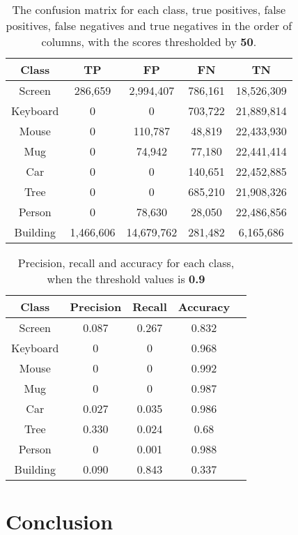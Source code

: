 \documentclass[conference]{IEEEtran}
\begin{document}
\begin{table}[!h]
\caption{The confusion matrix for each class, true positives, false positives, false negatives and true negatives in the order of columns, with the scores thresholded by \textbf{50}.}
\label{table_example}
\centering
\begin{tabular}{||c|c|c|c|c||}
\hline
Class & TP & FP & FN & TN \\
\hline
Screen & 286,659 & 2,994,407 & 786,161 & 18,526,309 \\
\hline
Keyboard & 0 & 0 & 703,722 & 21,889,814 \\
\hline
Mouse & 0 & 110,787 & 48,819 & 22,433,930 \\
\hline
Mug & 0 & 74,942 & 77,180 & 22,441,414 \\
\hline
Car & 0 & 0 & 140,651 & 22,452,885 \\
\hline
Tree & 0 & 0 & 685,210 & 21,908,326 \\
\hline
Person & 0 & 78,630 & 28,050 & 22,486,856 \\
\hline
Building & 1,466,606 & 14,679,762 & 281,482 & 6,165,686 \\
\hline
\end{tabular}
\end{table}

\begin{table}[!h]
\caption{Precision, recall and accuracy for each class, when the threshold values is \textbf{0.9}}
\label{table_example}
\centering
\begin{tabular}{||c|c|c|c|c||}
\hline
Class & Precision & Recall & Accuracy \\
\hline 
Screen & 0.087 & 0.267 & 0.832 \\
\hline
Keyboard & 0 & 0 & 0.968 \\
\hline
Mouse & 0 & 0 & 0.992 \\
\hline
Mug & 0 & 0 & 0.987 \\
\hline
Car & 0.027 & 0.035 & 0.986 \\
\hline
Tree & 0.330 & 0.024 & 0.68 \\
\hline
Person & 0 & 0.001 & 0.988 \\
\hline
Building & 0.090 & 0.843 & 0.337 \\
\hline
\end{tabular}
\end{table}

\section{Conclusion}
\end{document}
